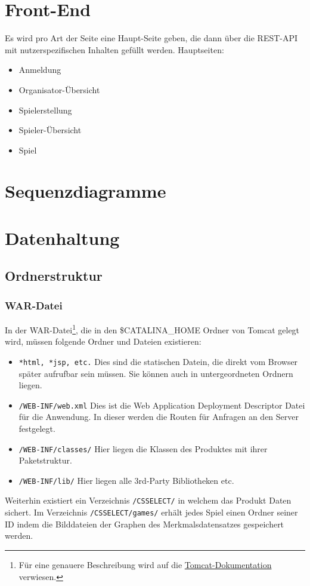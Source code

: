 \documentclass[a4paper]{scrreprt}
\begin{document}
	\chapter{Front-End}
	Es wird pro Art der Seite eine Haupt-Seite geben, die dann über die REST-API mit nutzerspezifischen Inhalten gefüllt werden.
	Hauptseiten:
	\begin{itemize}
		\item   Anmeldung
		\item   Organisator-Übersicht
		\item   Spielerstellung
		\item   Spieler-Übersicht
		\item   Spiel
	\end{itemize}
	\chapter{Sequenzdiagramme}
	
	\chapter{Datenhaltung}
	
	\section{Ordnerstruktur}
    \subsection{WAR-Datei}
	In der WAR-Datei\footnote{Für eine genauere Beschreibung wird auf die \href{https://tomcat.apache.org/tomcat-7.0-doc/appdev/deployment.html\#Standard\_Directory\_Layout}{Tomcat-Dokumentation} verwiesen.}, die in den \$CATALINA\_HOME Ordner von Tomcat gelegt wird, müssen folgende Ordner und Dateien existieren:
    \begin{itemize}
        \item \texttt{*html, *jsp, etc.} Dies sind die statischen Datein, die direkt vom Browser später aufrufbar sein müssen. Sie können auch in untergeordneten Ordnern liegen.
        \item \texttt{/WEB-INF/web.xml} Dies ist die Web Application Deployment Descriptor Datei für die Anwendung. In dieser werden die Routen für Anfragen an den Server festgelegt.
        \item \texttt{/WEB-INF/classes/} Hier liegen die Klassen des Produktes mit ihrer Paketstruktur.
        \item \texttt{/WEB-INF/lib/} Hier liegen alle 3rd-Party Bibliotheken etc. 
    \end{itemize}
	Weiterhin existiert ein Verzeichnis \texttt{/CSSELECT/} in welchem das Produkt Daten sichert.
	Im Verzeichnis \texttt{/CSSELECT/games/} erhält jedes Spiel einen Ordner seiner ID indem die Bilddateien der Graphen des Merkmalsdatensatzes gespeichert werden.
	
\end{document}
